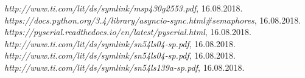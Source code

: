 \documentclass[a4paper,12pt, projekat]{etf}
\begin{document}
\begin{thebibliography}{10}
 \emph{http://www.ti.com/lit/ds/symlink/msp430g2553.pdf}, 16.08.2018.
 \emph{https://docs.python.org/3.4/library/asyncio-sync.html\#semaphores}, 16.08.2018.
 \emph{https://pyserial.readthedocs.io/en/latest/pyserial.html}, 16.08.2018.
 \emph{http://www.ti.com/lit/ds/symlink/sn54ls04-sp.pdf}, 16.08.2018.
 \emph{http://www.ti.com/lit/ds/symlink/sn54ls04-sp.pdf}, 16.08.2018.
 \emph{http://www.ti.com/lit/ds/symlink/sn54ls139a-sp.pdf}, 16.08.2018.
\end{thebibliography}
\end{document}
